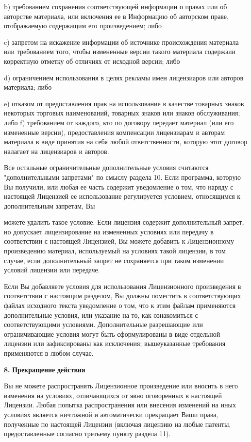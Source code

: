 b) требованием сохранения соответствующей информации о правах или об авторстве материала, или включения ее в Информацию об авторском праве, отображаемую содержащим его произведением; либо

c) запретом на искажение информации об источнике происхождения материала или требованием того, чтобы измененные версии такого материала содержали корректную отметку об отличиях от исходной версии; либо

d) ограничением использования в целях рекламы имен лицензиаров или авторов материала; либо

e) отказом от предоставления прав на использование в качестве товарных знаков некоторых торговых наименований, товарных знаков или знаков обслуживания; либо f) требованием от каждого, кто по договору передает материал (или его измененные версии), предоставления компенсации лицензиарам и авторам материала в виде принятия на себя любой ответственности, которую этот договор налагает на лицензиаров и авторов.

Все остальные ограничительные дополнительные условия считаются "{}дополнительными запретами"{} по смыслу раздела 10. Если программа, которую Вы получили, или любая ее часть содержит уведомление о том, что наряду с настоящей Лицензией ее использование регулируется условием, относящимся к дополнительным запретам, Вы

можете удалить такое условие. Если лицензия содержит дополнительный запрет, но допускает лицензирование на измененных условиях или передачу в соответствии с настоящей Лицензией, Вы можете добавить к Лицензионному произведению материал, используемый на условиях такой лицензии, в том случае, если дополнительный запрет не сохраняется при таком изменении условий лицензии или передаче.

Если Вы добавляете условия для использования Лицензионного произведения в соответствии с настоящим разделом, Вы должны поместить в соответствующих файлах исходного текста уведомление о том, что к этим файлам применяются дополнительные условия, или указание на то, как ознакомиться с соответствующими условиями. Дополнительные разрешающие или ограничивающие условия могут быть сформулированы в виде отдельной лицензии или зафиксированы как исключения; вышеуказанные требования применяются в любом случае.

{\bfseries{8.}} {\bfseries{Прекращение}} {\bfseries{действия}}

Вы не можете распространять Лицензионное произведение или вносить в него изменения на условиях, отличающихся от явно оговоренных в настоящей Лицензии. Любая попытка распространения или внесения изменений на иных условиях является ничтожной и автоматически прекращает Ваши права, полученные по настоящей Лицензии (включая лицензию на любые патенты, предоставленные согласно третьему пункту раздела 11).

